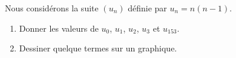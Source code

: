 
\begin{exercice}\label{exosmath-0168}

    Nous considérons la suite \( (u_n)\) définie par \( u_n=n(n-1)\).
    \begin{enumerate}
        \item
            Donner les valeurs de \( u_0\), \( u_1\), \( u_2\), \( u_3\) et \( u_{153}\).
        \item
            Dessiner quelque termes sur un graphique.
    \end{enumerate}

\end{exercice}
